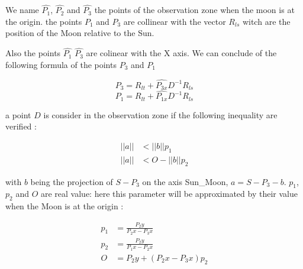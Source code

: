 \documentclass{article} %
\begin{document}
		
		
		We name $\hat{P_1}$, $\hat{P_2}$ and $\hat{P_3}$ the points of the observation zone when the moon is at the origin. the points $P_1$ and $P_3$ are collinear with the vector $R_{ls}$ witch are the position of the Moon relative to the Sun.
		
		Also the points $\hat{P_1}$ $\hat{P_3}$ are colinear with the X axis. We can conclude of the following formula of the points $P_3$ and $P_1$
		
		
		$$
		\begin{equation}
			P_3=R_{lt}+\hat{P_{3x}}D^{-1}R_{ls} 
		\end{equation}
		$$
		$$
		\begin{equation}
			P_1=R_{lt}+\hat{P_{1x}}D^{-1}R_{ls} 
		\end{equation}
		$$
		
		a point $D$ is consider in the observation zone if the following inequality are verified : 
		
		$$
		\begin{equation}
			\begin{align}
				||a||&<||b||p_1\\
				||a||&<O-||b||p_2
			\end{align}	
		\end{equation}
		$$
		
		with $b$ being the projection of $S-P_3$ on the axis Sun_Moon, $a=S-P_3-b$. $p_1$, $p_2$ and $O$ are real value: here this parameter will be approximated by their value when the Moon is at the origin :
		
		
		$$
		\begin{align}
			p_1&=\frac{P_2y}{P_2x-P_3x}\\
			p_2&=\frac{P_2y}{P_1x-P_2x}\\
			O&=P_2y+(P_2x-P_3x)p_2
		\end{align}	
		$$ 
		
\end{document}
